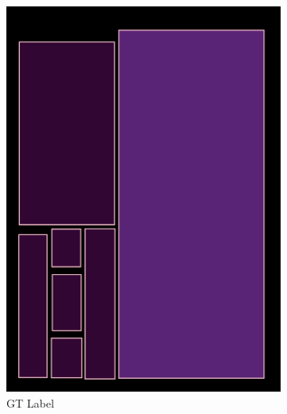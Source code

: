 \documentclass[aspectratio=1610]{beamer}
\begin{document}
\begin{frame}
\begin{figure}
\begin{subfigure}{.25\textwidth}
  \includegraphics[width=0.99\linewidth, clip=true, trim = 0mm 0mm 0mm 0mm]{figures/bbox/9rwJ51v.jpg}
  \caption{GT Label}
\end{subfigure}%
\begin{subfigure}{.25\textwidth}
  \centering

\end{subfigure}
\end{figure}
\end{frame}
\end{document}
